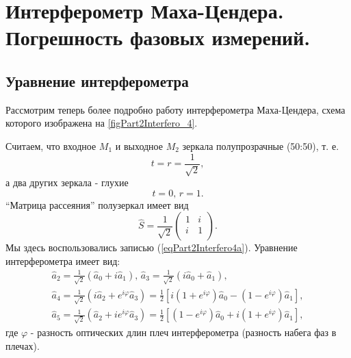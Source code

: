 \section{Интерферометр Маха-Цендера. Погрешность фазовых измерений.}
\subsection{Уравнение интерферометра}
Рассмотрим теперь более подробно работу интерферометра Маха-Цендера,
схема которого изображена на \autoref{figPart2Interfero_4}.



Считаем, что входное $M_1$ и выходное $M_2$ зеркала полупрозрачные
(50:50), т. е. 
\[
t = r = \frac{1}{\sqrt{2}},
\]
а два других зеркала - глухие
\[
t = 0, \, r = 1.
\]
``Матрица рассеяния'' полузеркал имеет вид 
\begin{equation}
\hat{S} = \frac{1}{\sqrt{2}} 
\left(
\begin{array}{cc}
1 & i \\
i & 1 \\
\end{array}
\right).
\nonumber
\end{equation}
Мы здесь воспользовались записью (\ref{eqPart2Interfero4a}). Уравнение
интерферометра имеет вид:
\begin{eqnarray}
\hat{a}_2 = \frac{1}{\sqrt{2}} \left(\hat{a}_0 + i \hat{a}_1\right),
\,
\hat{a}_3 = \frac{1}{\sqrt{2}} \left(i \hat{a}_0 + \hat{a}_1\right),
\nonumber \\
\hat{a}_4 = \frac{1}{\sqrt{2}} \left(i \hat{a}_2 + e^{i \varphi}
\hat{a}_3\right) = 
\frac{1}{2}\left[
i \left(1 + e^{i \varphi}\right)\hat{a}_0 -
\left(1 - e^{i \varphi}\right)\hat{a}_1
\right],
\nonumber \\
\hat{a}_5 = \frac{1}{\sqrt{2}} \left(\hat{a}_2 + i e^{i \varphi}
\hat{a}_3\right) = 
\frac{1}{2}\left[
\left(1 - e^{i \varphi}\right)\hat{a}_0 +
i \left(1 + e^{i \varphi}\right)\hat{a}_1
\right],
\label{eqPart2Interfero11}
\end{eqnarray}
где $\varphi$ - разность оптических длин плеч интерферометра (разность
набега фаз в плечах).

